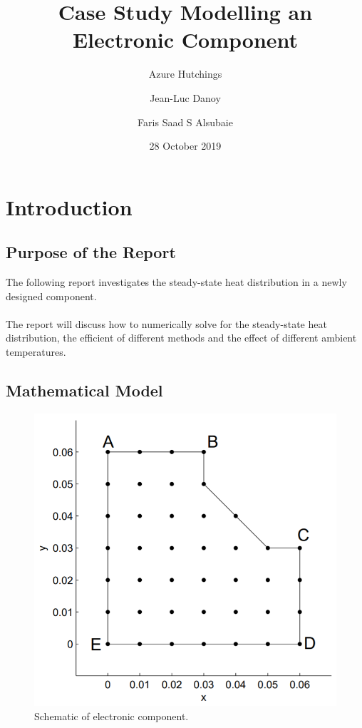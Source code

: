 \documentclass[12pt,a4paper]{article}
\title{Case Study Modelling an Electronic Component}
\author{
  Azure Hutchings
  \and
  Jean-Luc Danoy
  \and
  Faris Saad S Alsubaie
}
\date{28 October 2019}
\begin{document}
 
\begin{titlepage}
\maketitle
\end{titlepage}

\pagebreak

\tableofcontents

\pagebreak

\section{Introduction}

\subsection{Purpose of the Report}
The following report investigates the steady-state heat distribution in a newly designed component. 
\\\\
The report will discuss how to numerically solve for the steady-state heat distribution, the efficient of different methods and the effect of different ambient temperatures.

\subsection{Mathematical Model}

\begin{figure}[H]
	\center
	\includegraphics[width=0.9\linewidth]{images/Component.png}
	\caption{Schematic of electronic component.}
	\label{fig:componentSchematic}
\end{figure}
\end{document}
